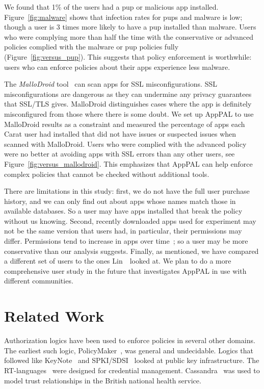 \documentclass[]{llncs}
\newcommand{\citep}[1]{\cite{#1}}
\begin{document}
We found that 1\% of the users had a \ac{pup} or malicious app installed.
Figure~\ref{fig:malware} shows that infection rates for \ac{pup}s and malware is low;
though a user is 3 times more likely to have a \ac{pup} installed than malware.
Users who were complying more than half the time with the conservative or advanced policies complied with the malware or \ac{pup} policies fully (Figure~\autoref{fig:versus_pup}).
This suggests that policy enforcement is worthwhile: users who can enforce policies about their apps experience less malware.

The \emph{MalloDroid} tool~\citep{Fahl:2012dj} can scan apps for SSL misconfigurations.
SSL misconfigurations are dangerous as they can undermine any privacy guarantees that SSL/TLS gives.
MalloDroid distinguishes cases where the app is definitely misconfigured from those where there is some doubt.
We set up AppPAL to use MalloDroid results as a constraint and measured the percentage of apps each Carat user had installed that did not have issues or suspected issues when scanned with MalloDroid.
Users who were complied with the advanced policy were no better at avoiding apps with SSL errors than any other users, see Figure~\autoref{fig:versus_mallodroid}.
This emphasizes that AppPAL can help enforce complex policies that cannot be checked without additional tools.

There are limitations in this study:
first, we do not have the full user purchase history, and we can only find out about apps whose names match those in available databases.
So a user may have apps installed that break the policy without us knowing.
Second, recently downloaded apps used for experiment may not be the same version that users had, in particular, their permissions may differ.
Permissions tend to increase in apps over time~\cite{Wei:2012id}; so a user may be more conservative than our analysis suggests.
Finally, as mentioned, we have compared a different set of users to the ones Lin~\etal~looked at.
We plan to do a more comprehensive user study in the future that investigates AppPAL in use with different communities.

\section{Related Work}

Authorization logics have been used to enforce policies in several other domains.
The earliest such logic, PolicyMaker~\cite{Blaze:dj}, was general and undecidable.
Logics that followed like KeyNote~\cite{Blaze:1999fa} and SPKI/SDSI~\cite{Ellison:1999ui} looked at public key infrastructure.
The RT-languages~\cite{Li:2002if} were designed for credential management.
Cassandra~\cite{Becker:2004fi} was used to model trust relationships in the British national health service.
\end{document}
